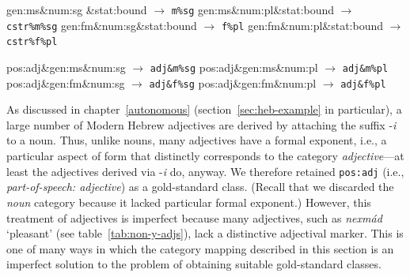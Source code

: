 {\begin{description}
\begin{exe}
\ex  
\begin{xlist}
		\ex gen:ms\&num:sg \&stat:bound \quad $\to$ \quad \texttt{m\%sg} \label{ex:cstr:m-sg}
		\ex gen:ms\&num:pl\&stat:bound \quad $\to$ \quad \texttt{cstr\%m\%sg} \label{ex:cstr:m-pl}
		\ex gen:fm\&num:sg\&stat:bound  \quad $\to$ \quad \texttt{f\%pl} \label{ex:cstr:f-sg}
		\ex gen:fm\&num:pl\&stat:bound \quad $\to$ \quad \texttt{cstr\%f\%pl} \label{ex:cstr:f-pl}
	\end{xlist} \label{ex:cstr-cats}
\ex  
\begin{xlist}
		\ex pos:adj\&gen:ms\&num:sg \quad $\to$ \quad \texttt{adj\&m\%sg} \label{ex:adj:m-sg}
		\ex pos:adj\&gen:ms\&num:pl \quad $\to$ \quad \texttt{adj\&m\%pl} \label{ex:adj:m-pl}
		\ex pos:adj\&gen:fm\&num:sg \quad $\to$ \quad \texttt{adj\&f\%sg} \label{ex:adj:f-sg}
		\ex pos:adj\&gen:fm\&num:pl \quad $\to$ \quad \texttt{adj\&f\%pl} \label{ex:adj:f-pl}
	\end{xlist} \label{ex:adj-cats}
\end{exe}

\item[Adjectives.]
As discussed in chapter~\ref{autonomous} (section~\ref{sec:heb-example} in particular), 
a large number of Modern Hebrew adjectives are derived by attaching the 
suffix -\textit{i}
to a noun. Thus, unlike nouns, many adjectives have a formal exponent, i.e., a particular aspect of form that distinctly corresponds to the category \emph{adjective}---at least the adjectives derived via -\textit{i} do, anyway. 
We therefore retained
\texttt{pos:adj} (i.e., \textit{part-of-speech: adjective}) as a gold-standard class.
(Recall that we discarded the \emph{noun} category because it lacked particular formal exponent.) 
However, this treatment of adjectives is imperfect because many adjectives, such as
\textit{nexm\'{a}d} `pleasant' (see table~\ref{tab:non-y-adjs}),
lack a distinctive adjectival marker.  This is one of many ways in which the category mapping described in this section is an imperfect solution to the problem of obtaining suitable gold-standard classes.  
 

\end{description}}
